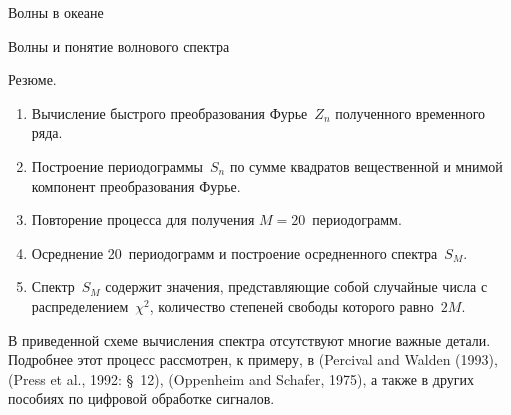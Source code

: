 \begin{chapter}{Волны в океане}
\begin{section}{Волны и понятие волнового спектра}
\begin{paragraph}{Резюме.}
\begin{enumerate}
\item
Вычисление быстрого преобразования Фурье~$Z_{n}$ полученного временного ряда.
%

\item
Построение периодограммы~$S_{n}$ по сумме квадратов вещественной и мнимой
компонент преобразования Фурье.
%

\item
Повторение процесса для получения $M=20$~периодограмм.
%

\item
Осреднение 20~периодограмм и построение осредненного спектра~$S_{M}$.
%

\item
Спектр~$S_{M}$ содержит значения, представляющие собой случайные числа с
распределением~$\chi ^{2}$, количество степеней свободы которого равно~$2 M$.
%
\end{enumerate}
В приведенной схеме вычисления спектра отсутствуют многие важные детали.
Подробнее этот процесс рассмотрен, к примеру, в (Percival and Walden (1993), 
(Press et al., 1992: \S~12), (Oppenheim and Schafer, 1975), а также
в других пособиях по цифровой обработке сигналов.
%
\end{paragraph}
\end{section}


\end{chapter}
